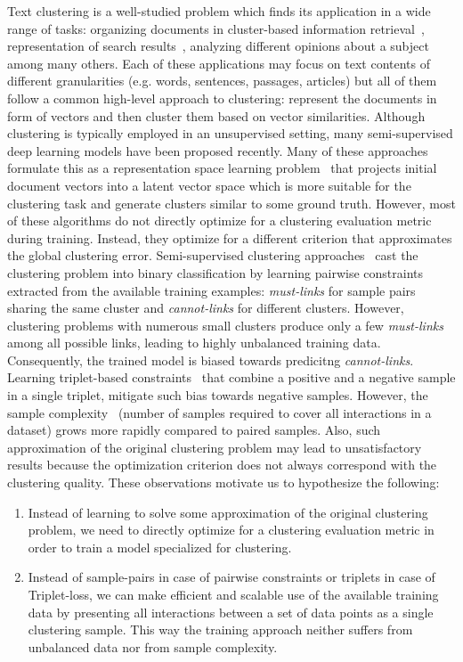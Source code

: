 \documentclass[11pt,a4paper]{article}
\begin{document}
Text clustering is a well-studied problem which finds its application in a wide range of tasks: organizing documents in cluster-based information retrieval~\citep{cutting2017scatter,mei2014proximity}, representation of search results~\citep{37745,navigli2010inducing}, analyzing different opinions about a subject~\citep{tsirakis2017large} among many others. Each of these applications may focus on text contents of different granularities (e.g. words, sentences, passages, articles) but all of them follow a common high-level approach to clustering: represent the documents in form of vectors and then cluster them based on vector similarities. Although clustering is typically employed in an unsupervised setting, many semi-supervised deep learning models have been proposed recently. Many of these approaches formulate this as a representation space learning problem~\citep{yang2017towards} that projects initial document vectors into a latent vector space which is more suitable for the clustering task and generate clusters similar to some ground truth. However, most of these algorithms do not directly optimize for a clustering evaluation metric during training. Instead, they optimize for a different criterion that approximates the global clustering error. Semi-supervised clustering approaches~\citep{basu2002semi} cast the clustering problem into binary classification by learning pairwise constraints extracted from the available training examples: \textit{must-links} for sample pairs sharing the same cluster and \textit{cannot-links} for different clusters. However, clustering problems with numerous small clusters produce only a few \textit{must-links} among all possible links, leading to highly unbalanced training data. Consequently, the trained model is biased towards predicitng \textit{cannot-links}. Learning triplet-based constraints~\citep{dor2018learning} that combine a positive and a negative sample in a single triplet, mitigate such bias towards negative samples. However, the sample complexity~\citep{bartlett1998sample} (number of samples required to cover all interactions in a dataset) grows more rapidly compared to paired samples. Also, such approximation of the original clustering problem may lead to unsatisfactory results because the optimization criterion does not always correspond with the clustering quality. These observations motivate us to hypothesize the following:

\begin{enumerate}
    \item Instead of learning to solve some approximation of the original clustering problem, we need to directly optimize for a clustering evaluation metric in order to train a model specialized for clustering.
    \item Instead of sample-pairs in case of pairwise constraints or triplets in case of Triplet-loss, we can make efficient and scalable use of the available training data by presenting all interactions between a set of data points as a single clustering sample. This way the training approach neither suffers from unbalanced data nor from sample complexity.
\end{enumerate}
\end{document}
